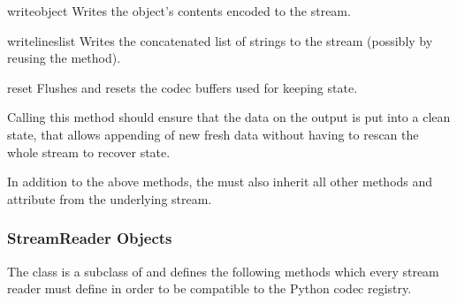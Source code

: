 \begin{methoddesc}{write}{object}
  Writes the object's contents encoded to the stream.
\end{methoddesc}

\begin{methoddesc}{writelines}{list}
  Writes the concatenated list of strings to the stream (possibly by
  reusing the  method).
\end{methoddesc}

\begin{methoddesc}{reset}{}
  Flushes and resets the codec buffers used for keeping state.

  Calling this method should ensure that the data on the output is put
  into a clean state, that allows appending of new fresh data without
  having to rescan the whole stream to recover state.
\end{methoddesc}

In addition to the above methods, the  must also
inherit all other methods and attribute from the underlying stream.


\subsubsection{StreamReader Objects \label{stream-reader-objects}}

The  class is a subclass of  and
defines the following methods which every stream reader must define in
order to be compatible to the Python codec registry.

